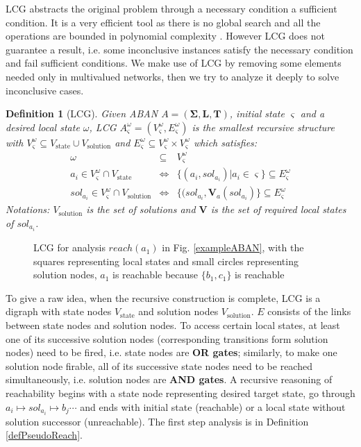 \documentclass[en]{jdoc}
\newtheorem{definition}{Definition}
\newcommand{\omesi}{^\omega_\varsigma}
\begin{document}
LCG abstracts the original problem through a necessary condition a sufficient condition. It is a very efficient tool as there is no global search and all the operations are bounded in polynomial complexity \cite{pauleve2012}. However LCG does not guarantee a result, i.e. some inconclusive instances satisfy the necessary condition and fail sufficient conditions. We make use of LCG by removing some elements needed only in multivalued networks, then we try to analyze it deeply to solve inconclusive cases.
\begin{definition}[LCG]\label{defLCG}
Given ABAN $A = (\mathbf{\Sigma},\mathbf{L},\mathbf{T})$, initial state $\varsigma$ and a desired local state $\omega$, LCG $A\omesi= (V\omesi,E\omesi)$ is the smallest recursive structure with $V\omesi \subseteq V_{\text{state}}\cup V_{\text{solution}}$ and $E\omesi \subseteq V\omesi\times V\omesi$ which satisfies:
\begin{eqnarray*}
\omega&\subseteq& V\omesi \\
a_i\in V\omesi\cap V_{\text{state}} &\Leftrightarrow& \{ (a_i, sol_{a_i})| a_i\in \varsigma\}\subseteq E\omesi \\
sol_{a_i}\in V\omesi \cap V_{\text{solution}}&\Leftrightarrow& \{ (sol_{a_i},\mathbf{V}_a (sol_{a_i})\}\subseteq E\omesi
\end{eqnarray*}
Notations: $V_{\text{solution}}$ is the set of solutions and $\mathbf{V}$ is the set of required local states of $sol_{a_i}$.
\end{definition}

\begin{figure}[ht]
    \centering
    
    \caption{LCG for analysis $reach(a_1)$ in Fig. \ref{exampleABAN}, with the squares representing local states and small circles representing solution nodes, $a_1$ is reachable because $\{b_1,c_1\}$ is reachable}
    \label{LCGexample}
\end{figure}

To give a raw idea, when the recursive construction is complete, LCG is a digraph with state nodes $V_{\text{state}}$ and solution nodes $V_{\text{solution}}$. $E$ consists of the links between state nodes and solution nodes. To access certain local states, at least one of its successive solution nodes (corresponding transitions form solution nodes) need to be fired, i.e. state nodes are \textbf{OR gates}; similarly, to make one solution node firable, all of its successive state nodes need to be reached simultaneously, i.e. solution nodes are \textbf{AND gates}. A recursive reasoning of reachability begins with a state node representing desired target state, go through $a_i\mapsto sol_{a_i}\mapsto b_j \cdots$ and ends with initial state (reachable) or a local state without solution successor (unreachable). The first step analysis is in Definition \ref{defPseudoReach}.
\end{document}
